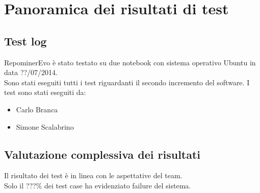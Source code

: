 \chapter{Panoramica dei risultati di test}

\section{Test log}

RepominerEvo è stato testato su due notebook con sistema operativo Ubuntu in data ??/07/2014.\\
Sono stati eseguiti tutti i test riguardanti il secondo incremento del software.
I test sono stati eseguiti da:
\begin{itemize}
\item Carlo Branca
\item Simone Scalabrino
\end{itemize}

\section{Valutazione complessiva dei risultati}

Il risultato dei test è in linea con le aspettative del team.\\
Solo il ???\% dei test case ha evidenziato failure del sistema.\\

\clearpage